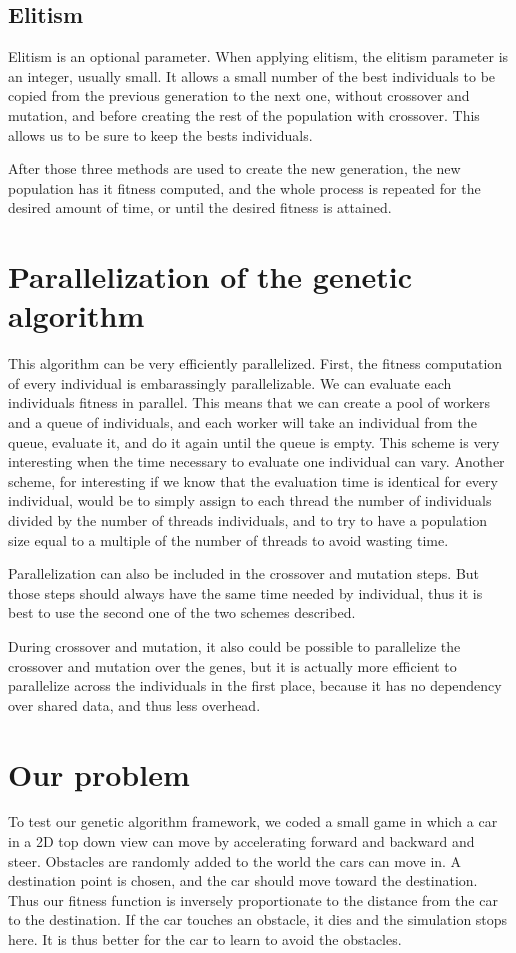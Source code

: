 \documentclass{acm_proc_article-sp}
\begin{document}
\subsection{Elitism}
Elitism is an optional parameter. When applying elitism, the elitism parameter is an integer, usually small. It allows a small number of the best individuals to be copied from the previous generation to the next one, without crossover and mutation, and before creating the rest of the population with crossover. This allows us to be sure to keep the bests individuals.

After those three methods are used to create the new generation, the new population has it fitness computed, and the whole process is repeated for the desired amount of time, or until the desired fitness is attained.


\section{Parallelization of the genetic algorithm}
This algorithm can be very efficiently parallelized. First, the fitness computation of every individual is embarassingly parallelizable. We can evaluate each individuals fitness in parallel. This means that we can create a pool of workers and a queue of individuals, and each worker will take an individual from the queue, evaluate it, and do it again until the queue is empty. This scheme is very interesting when the time necessary to evaluate one individual can vary. Another scheme, for interesting if we know that the evaluation time is identical for every individual, would be to simply assign to each thread the number of individuals divided by the number of threads individuals, and to try to have a population size equal to a multiple of the number of threads to avoid wasting time.

Parallelization can also be included in the crossover and mutation steps. But those steps should always have the same time needed by individual, thus it is best to use the second one of the two schemes described.

During crossover and mutation, it also could be possible to parallelize the crossover and mutation over the genes, but it is actually more efficient to parallelize across the individuals in the first place, because it has no dependency over shared data, and thus less overhead.

\section{Our problem}
To test our genetic algorithm framework, we coded a small game in which a car in a 2D top down view can move by accelerating forward and backward and steer. Obstacles are randomly added to the world the cars can move in. A destination point is chosen, and the car should move toward the destination. Thus our fitness function is inversely proportionate to the distance from the car to the destination. If the car touches an obstacle, it dies and the simulation stops here. It is thus better for the car to learn to avoid the obstacles.
\end{document}
